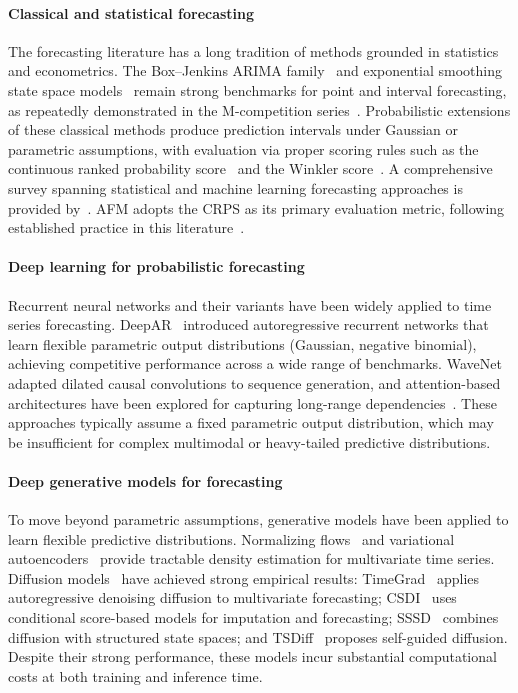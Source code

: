 \documentclass[preprint,12pt,authoryear]{elsarticle}
\begin{document}
{
\paragraph{Classical and statistical forecasting}
The forecasting literature has a long tradition of methods grounded in statistics and econometrics. The Box--Jenkins ARIMA family~\citep{Box1994Timeseries} and exponential smoothing state space models~\citep{hyndman2008forecasting} remain strong benchmarks for point and interval forecasting, as repeatedly demonstrated in the M-competition series~\citep{makridakis2020m4}. Probabilistic extensions of these classical methods produce prediction intervals under Gaussian or parametric assumptions, with evaluation via proper scoring rules such as the continuous ranked probability score~\citep{gneiting2007strictly} and the Winkler score~\citep{winkler1996scoring}. A comprehensive survey spanning statistical and machine learning forecasting approaches is provided by~\citet{petropoulos2022forecasting}. AFM adopts the CRPS as its primary evaluation metric, following established practice in this literature~\citep{hyndman2006another}.

\paragraph{Deep learning for probabilistic forecasting}
Recurrent neural networks and their variants have been widely applied to time series forecasting. DeepAR~\citep{salinas2020deepar} introduced autoregressive recurrent networks that learn flexible parametric output distributions (Gaussian, negative binomial), achieving competitive performance across a wide range of benchmarks. WaveNet~\citep{van2016wavenet} adapted dilated causal convolutions to sequence generation, and attention-based architectures have been explored for capturing long-range dependencies~\citep{Lim2021Timeseries}. These approaches typically assume a fixed parametric output distribution, which may be insufficient for complex multimodal or heavy-tailed predictive distributions.

\paragraph{Deep generative models for forecasting}
To move beyond parametric assumptions, generative models have been applied to learn flexible predictive distributions. Normalizing flows~\citep{rasul2020multivariate} and variational autoencoders~\citep{desai2021timevae,karl2016deep} provide tractable density estimation for multivariate time series. Diffusion models~\citep{ho2020denoising,song2020score} have achieved strong empirical results: TimeGrad~\citep{rasul2021autoregressive} applies autoregressive denoising diffusion to multivariate forecasting; CSDI~\citep{tashiro2021csdi} uses conditional score-based models for imputation and forecasting; SSSD~\citep{alcaraz2022diffusion} combines diffusion with structured state spaces; and TSDiff~\citep{kollovieh2023predict} proposes self-guided diffusion. Despite their strong performance, these models incur substantial computational costs at both training and inference time.

}
\end{document}
